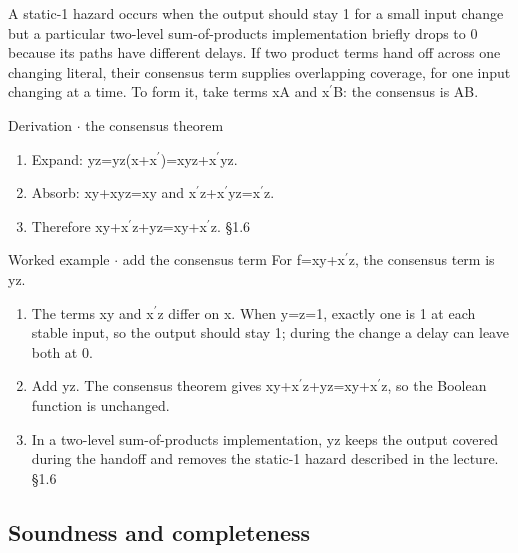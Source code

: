 \documentclass[11pt]{article}
\begin{document}
\begin{keepsection}
\begin{keepsection}
A static-1 hazard occurs when the output should stay 1 for a small input change but a particular two-level sum-of-products implementation briefly drops to 0 because its paths have different delays. If two product terms hand off across one changing literal, their consensus term supplies overlapping coverage, for one input changing at a time. To form it, take terms xA and x\ensuremath{{}^{\prime}}B: the consensus is AB.

\begin{workedbox}{Derivation \ensuremath{\cdot} the consensus theorem}
\begin{enumerate}
\item Expand: yz=yz(x+x\ensuremath{{}^{\prime}})=xyz+x\ensuremath{{}^{\prime}}yz.
\item Absorb: xy+xyz=xy and x\ensuremath{{}^{\prime}}z+x\ensuremath{{}^{\prime}}yz=x\ensuremath{{}^{\prime}}z.
\item Therefore xy+x\ensuremath{{}^{\prime}}z+yz=xy+x\ensuremath{{}^{\prime}}z. \hfill{\small\color{FAUblue}§1.6}
\end{enumerate}
\end{workedbox}

\begin{workedbox}{Worked example \ensuremath{\cdot} add the consensus term}
For f=xy+x\ensuremath{{}^{\prime}}z, the consensus term is yz.

\begin{enumerate}
\item The terms xy and x\ensuremath{{}^{\prime}}z differ on x. When y=z=1, exactly one is 1 at each stable input, so the output should stay 1; during the change a delay can leave both at 0.
\item Add yz. The consensus theorem gives xy+x\ensuremath{{}^{\prime}}z+yz=xy+x\ensuremath{{}^{\prime}}z, so the Boolean function is unchanged.
\item In a two-level sum-of-products implementation, yz keeps the output covered during the handoff and removes the static-1 hazard described in the lecture. \hfill{\small\color{FAUblue}§1.6}
\end{enumerate}
\end{workedbox}
\end{keepsection}

\begin{keepsection}
\subsection{Soundness and completeness}


\end{keepsection}
\end{keepsection}
\end{document}
